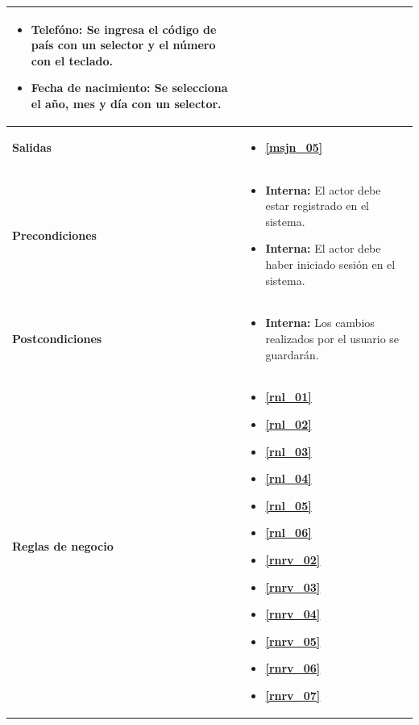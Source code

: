 \begin{center}
\begin{longtable}{| p{3.5cm} | p{11.5cm} |}
\begin{itemize}
              \item \textbf{Telefóno}: Se ingresa el código de país con un selector y el número con el teclado.
              \item \textbf{Fecha de nacimiento}: Se selecciona el año, mes y día con un selector.
            \end{itemize} \\
        \hline  
          \textbf{Salidas} &  
  	  \begin{itemize}
  	    \item \textbf{\ref{msjn_05}}
	  \end{itemize} \\
        \hline  
          \textbf{Precondiciones} & 
		\begin{itemize}
	              \item \textbf{Interna:} El actor debe estar registrado en el sistema.
	              \item \textbf{Interna:} El actor debe haber iniciado sesión en el sistema.
	            \end{itemize} \\
        \hline  
          \textbf{Postcondiciones} &
	\begin{itemize}
              \item \textbf{Interna:} Los cambios realizados por el usuario se guardarán.
	\end{itemize} \\
        \hline
          \textbf{Reglas de negocio} & 
	\begin{itemize}
               \item \textbf{\ref{rnl_01}}
               \item \textbf{\ref{rnl_02}}
               \item \textbf{\ref{rnl_03}}
               \item \textbf{\ref{rnl_04}}
               \item \textbf{\ref{rnl_05}}
               \item \textbf{\ref{rnl_06}}
               \item \textbf{\ref{rnrv_02}}
               \item \textbf{\ref{rnrv_03}}
               \item \textbf{\ref{rnrv_04}}
               \item \textbf{\ref{rnrv_05}}
               \item \textbf{\ref{rnrv_06}}
               \item \textbf{\ref{rnrv_07}}

\end{itemize}
\end{longtable}
\end{center}

